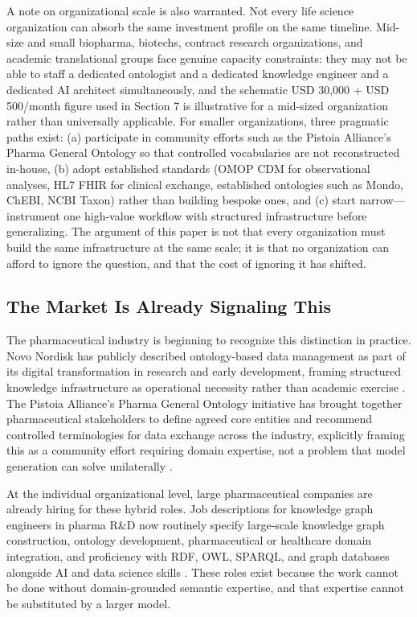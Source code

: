\documentclass[man,12pt,donotrepeattitle]{apa7}
\begin{document}
A note on organizational scale is also warranted. Not every life science
organization can absorb the same investment profile on the same timeline.
Mid-size and small biopharma, biotechs, contract research organizations, and
academic translational groups face genuine capacity constraints: they may not
be able to staff a dedicated ontologist and a dedicated knowledge engineer
and a dedicated AI architect simultaneously, and the schematic USD 30,000 +
USD 500/month figure used in Section 7 is illustrative for a mid-sized
organization rather than universally applicable. For smaller organizations,
three pragmatic paths exist: (a) participate in community efforts such as
the Pistoia Alliance's Pharma General Ontology so that controlled
vocabularies are not reconstructed in-house, (b) adopt established standards
(OMOP CDM for observational analyses, HL7 FHIR for clinical exchange,
established ontologies such as Mondo, ChEBI, NCBI Taxon) rather than
building bespoke ones, and (c) start narrow---instrument one high-value
workflow with structured infrastructure before generalizing. The argument of
this paper is not that every organization must build the same infrastructure
at the same scale; it is that no organization can afford to ignore the
question, and that the cost of ignoring it has shifted.

\subsection{The Market Is Already Signaling This}

The pharmaceutical industry is beginning to recognize this distinction in
practice. Novo Nordisk has publicly described ontology-based data management
as part of its digital transformation in research and early development,
framing structured knowledge infrastructure as operational necessity rather
than academic exercise \parencite{tan2025}. The Pistoia Alliance's Pharma
General Ontology initiative has brought together pharmaceutical stakeholders
to define agreed core entities and recommend controlled terminologies for
data exchange across the industry, explicitly framing this as a community
effort requiring domain expertise, not a problem that model generation can
solve unilaterally \parencite{pistoiaalliance2025}.

At the individual organizational level, large pharmaceutical companies are
already hiring for these hybrid roles. Job descriptions for knowledge graph
engineers in pharma R\&D now routinely specify large-scale knowledge graph
construction, ontology development, pharmaceutical or healthcare domain
integration, and proficiency with RDF, OWL, SPARQL, and graph databases
alongside AI and data science skills \parencite{jj2026}. These roles exist
because the work cannot be done without domain-grounded semantic expertise,
and that expertise cannot be substituted by a larger model.
\end{document}
